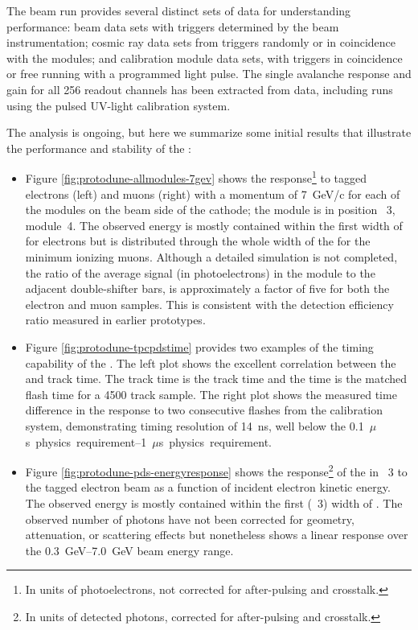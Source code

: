 The  beam run provides several distinct sets of data for understanding  performance: beam data sets with triggers determined by the beam instrumentation; cosmic ray data sets from triggers randomly or in coincidence with the  modules; and calibration module data sets, with triggers in coincidence or free running with a programmed light pulse. 
The single avalanche response and gain for all \num{256} 
readout channels has been extracted from  data, including runs using the pulsed UV-light calibration system.

The analysis is ongoing, but here we summarize some initial results that illustrate the performance and stability of the :

\begin{itemize}
   \item Figure \ref{fig:protodune-allmodules-7gev} shows the response\footnote{In units of photoelectrons, not corrected for  after-pulsing and crosstalk.} to tagged electrons (left) and muons (right) with a momentum of \SI{7}{GeV/c} for each of the  modules on the beam side of the cathode; the  module is in position ~3,  module~4. The observed energy is mostly contained within the first  width of  for electrons but is distributed through the whole width of the  for the minimum ionizing muons. Although a detailed simulation is not completed, the ratio of the average signal (in photoelectrons) in the  module to the adjacent double-shifter bars, is approximately a factor of five for both the electron and muon samples. This is consistent with the detection efficiency ratio measured in earlier prototypes.
   
    \item Figure \ref{fig:protodune-tpcpdstime} provides two examples of the timing capability of the . The left plot shows the excellent correlation between the  and  track time. 
    The  track time is the track \tzero time and the  time is the matched flash time for a 4500 track sample. The right plot shows the measured time difference in the   response to two consecutive flashes from the calibration system, demonstrating timing resolution of \SI{14}{ns}, well below the \SIrange{0.1}{1}{$\mu$s} physics requirement.
 
    \item Figure \ref{fig:protodune-pds-energyresponse} shows the response\footnote{In units of detected photons, corrected for  after-pulsing and crosstalk.} of the  in ~3 to the tagged electron beam as a function of incident electron kinetic energy. 
    The observed energy is mostly contained within the first  (~3) width of . The observed number of photons have not been corrected for geometry, attenuation, or scattering effects but nonetheless shows a linear response over the \SIrange{0.3}{7.0}{GeV} beam energy range.   
    

\end{itemize}
